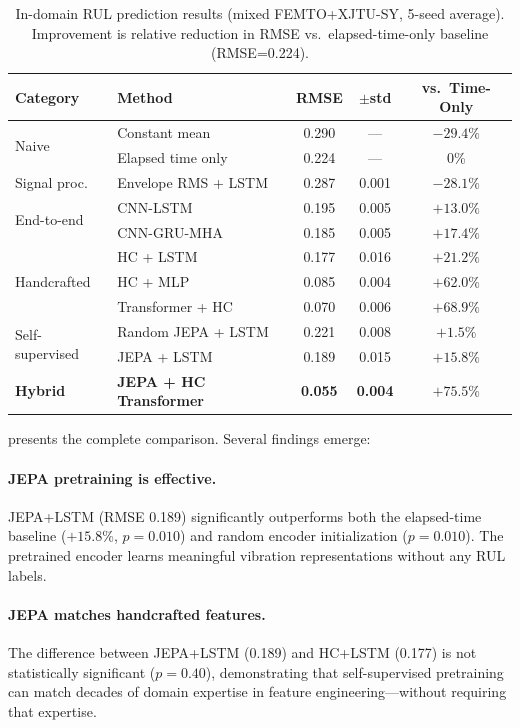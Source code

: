 \begin{table}[t]
\centering
\caption{In-domain RUL prediction results (mixed FEMTO+XJTU-SY, 5-seed average). Improvement is relative reduction in RMSE vs.\ elapsed-time-only baseline (RMSE=0.224).}
\label{tab:main_results}
\small
\begin{tabular}{@{}llccc@{}}
\toprule
Category & Method & RMSE & $\pm$std & vs.\ Time-Only \\
\midrule
\multirow{2}{*}{Naive} & Constant mean & 0.290 & --- & $-29.4\%$ \\
& Elapsed time only & 0.224 & --- & 0\% \\
\midrule
Signal proc. & Envelope RMS + LSTM & 0.287 & 0.001 & $-28.1\%$ \\
\midrule
\multirow{2}{*}{End-to-end} & CNN-LSTM & 0.195 & 0.005 & $+13.0\%$ \\
& CNN-GRU-MHA & 0.185 & 0.005 & $+17.4\%$ \\
\midrule
\multirow{3}{*}{Handcrafted} & HC + LSTM & 0.177 & 0.016 & $+21.2\%$ \\
& HC + MLP & 0.085 & 0.004 & $+62.0\%$ \\
& Transformer + HC & 0.070 & 0.006 & $+68.9\%$ \\
\midrule
\multirow{2}{*}{Self-supervised} & Random JEPA + LSTM & 0.221 & 0.008 & $+1.5\%$ \\
& JEPA + LSTM & 0.189 & 0.015 & $+15.8\%$ \\
\midrule
\textbf{Hybrid} & \textbf{JEPA + HC Transformer} & \textbf{0.055} & \textbf{0.004} & $\mathbf{+75.5\%}$ \\
\bottomrule
\end{tabular}
\end{table}

 presents the complete comparison. Several findings emerge:

\paragraph{JEPA pretraining is effective.} JEPA+LSTM (RMSE 0.189) significantly outperforms both the elapsed-time baseline ($+15.8\%$, $p = 0.010$) and random encoder initialization ($p = 0.010$). The pretrained encoder learns meaningful vibration representations without any RUL labels.

\paragraph{JEPA matches handcrafted features.} The difference between JEPA+LSTM (0.189) and HC+LSTM (0.177) is not statistically significant ($p = 0.40$), demonstrating that self-supervised pretraining can match decades of domain expertise in feature engineering---without requiring that expertise.

